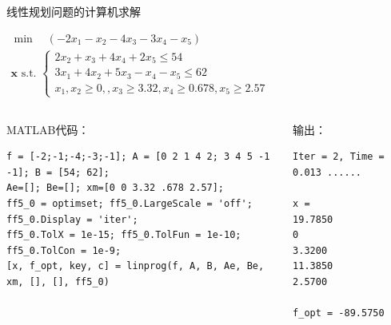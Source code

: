 \documentclass[10pt]{beamer}
\begin{document}
\begin{frame}[t,fragile]{线性规划问题的计算机求解}

\begin{example}[6-17]
	$\begin{array}{l}
	\min \quad \left(-2 x_{1}-x_{2}-4 x_{3}-3 x_{4}-x_{5}\right)\\
	\mathbf{x} \text { s.t. }\left\{\begin{array}{l}
	2 x_{2}+x_{3}+4 x_{4}+2 x_{5} \leqslant 54 \\
	3 x_{1}+4 x_{2}+5 x_{3}-x_{4}-x_{5} \leqslant 62 \\
	x_{1}, x_{2} \geqslant 0,, x_{3} \geqslant 3.32, x_{4} \geqslant 0.678, x_{5} \geqslant 2.57
	\end{array}\right.
	\end{array}
	$
\end{example}

	\begin{columns}[T]
			
	\begin{block}{MATLAB代码：}
\begin{lstlisting}
f = [-2;-1;-4;-3;-1]; A = [0 2 1 4 2; 3 4 5 -1 -1]; B = [54; 62];
Ae=[]; Be=[]; xm=[0 0 3.32 .678 2.57]; 
ff5_0 = optimset; ff5_0.LargeScale = 'off'; ff5_0.Display = 'iter';
ff5_0.TolX = 1e-15; ff5_0.TolFun = 1e-10; ff5_0.TolCon = 1e-9; 
[x, f_opt, key, c] = linprog(f, A, B, Ae, Be, xm, [], [], ff5_0)
\end{lstlisting}
	\end{block}	
			
			
	\begin{block}{输出：}
\begin{lstlisting}
Iter = 2, Time = 0.013 ......

x =
19.7850
0
3.3200
11.3850
2.5700

f_opt = -89.5750
\end{lstlisting}
	\end{block}

	\end{columns}		

\end{frame}
\end{document}

